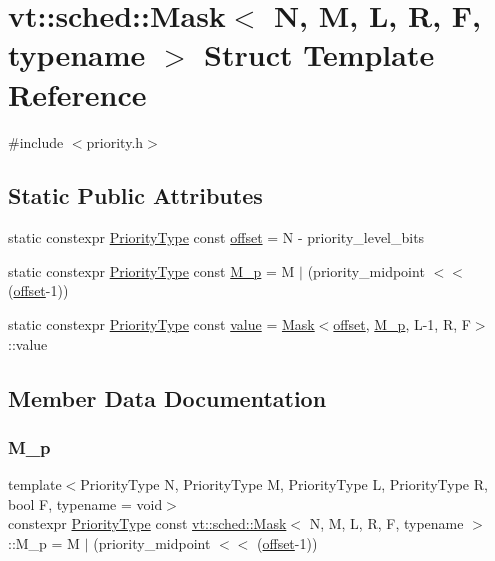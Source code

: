 \hypertarget{structvt_1_1sched_1_1_mask}{}\section{vt\+:\+:sched\+:\+:Mask$<$ N, M, L, R, F, typename $>$ Struct Template Reference}
\label{structvt_1_1sched_1_1_mask}


{\ttfamily \#include $<$priority.\+h$>$}

\subsection*{Static Public Attributes}
\begin{DoxyCompactItemize}
\item 
static constexpr \hyperlink{namespacevt_a86bff9f556eb761b27fc8600d006ac04}{Priority\+Type} const \hyperlink{structvt_1_1sched_1_1_mask_ae91f8382806210477762fc109a74fddd}{offset} = N -\/ priority\+\_\+level\+\_\+bits
\item 
static constexpr \hyperlink{namespacevt_a86bff9f556eb761b27fc8600d006ac04}{Priority\+Type} const \hyperlink{structvt_1_1sched_1_1_mask_a3949a195768183b0086b582bdc8855d2}{M\+\_\+p} = M $\vert$ (priority\+\_\+midpoint $<$$<$ (\hyperlink{structvt_1_1sched_1_1_mask_ae91f8382806210477762fc109a74fddd}{offset}-\/1))
\item 
static constexpr \hyperlink{namespacevt_a86bff9f556eb761b27fc8600d006ac04}{Priority\+Type} const \hyperlink{structvt_1_1sched_1_1_mask_a754152322550ef1c075cc4ecb702d6cd}{value} = \hyperlink{structvt_1_1sched_1_1_mask}{Mask}$<$\hyperlink{structvt_1_1sched_1_1_mask_ae91f8382806210477762fc109a74fddd}{offset}, \hyperlink{structvt_1_1sched_1_1_mask_a3949a195768183b0086b582bdc8855d2}{M\+\_\+p}, L-\/1, R, F$>$\+::value
\end{DoxyCompactItemize}


\subsection{Member Data Documentation}
\mbox{\label{structvt_1_1sched_1_1_mask_a3949a195768183b0086b582bdc8855d2}} 
\subsubsection{\texorpdfstring{M\+\_\+p}{M\_p}}
{\footnotesize\ttfamily template$<$Priority\+Type N, Priority\+Type M, Priority\+Type L, Priority\+Type R, bool F, typename  = void$>$ \\
constexpr \hyperlink{namespacevt_a86bff9f556eb761b27fc8600d006ac04}{Priority\+Type} const \hyperlink{structvt_1_1sched_1_1_mask}{vt\+::sched\+::\+Mask}$<$ N, M, L, R, F, typename $>$\+::M\+\_\+p = M $\vert$ (priority\+\_\+midpoint $<$$<$ (\hyperlink{structvt_1_1sched_1_1_mask_ae91f8382806210477762fc109a74fddd}{offset}-\/1))\hspace{0.3cm}{\ttfamily [static]}}

